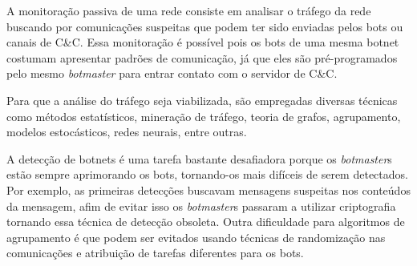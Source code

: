 A monitoração passiva de uma rede consiste em analisar o tráfego da rede buscando por comunicações suspeitas que podem ter sido enviadas pelos bots ou canais de C\&C. Essa monitoração é possível pois os bots de uma mesma botnet costumam apresentar padrões de comunicação, já que eles são pré-programados pelo mesmo \textit{botmaster} para entrar contato com o servidor de C\&C.

Para que a análise do tráfego seja viabilizada, são empregadas diversas técnicas como métodos estatísticos, mineração de tráfego, teoria de grafos, agrupamento, modelos estocásticos, redes neurais, entre outras.

A detecção de botnets é uma tarefa bastante desafiadora porque os \textit{botmaster}s estão sempre aprimorando os bots, tornando-os mais difíceis de serem detectados. Por exemplo, as primeiras detecções buscavam mensagens suspeitas nos conteúdos da mensagem, afim de evitar isso os \textit{botmaster}s passaram a utilizar criptografia tornando essa técnica de detecção obsoleta. Outra dificuldade para algoritmos de agrupamento é que podem ser evitados usando técnicas de randomização nas comunicações e atribuição de tarefas diferentes para os bots.


